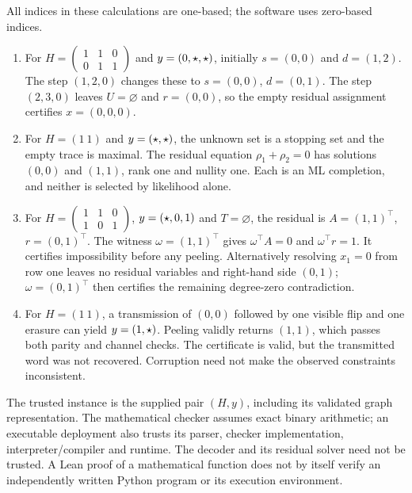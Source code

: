\begin{exa}\label{exa:core}
All indices in these calculations are one-based; the software uses
zero-based indices.
\begin{enumerate}[label=(\alph*),leftmargin=*]
\item For
$H=\left(\begin{smallmatrix}1&1&0\\0&1&1\end{smallmatrix}\right)$ and
$y=(0,\star,\star)$, initially $s=(0,0)$ and $d=(1,2)$.
The step $(1,2,0)$ changes these to $s=(0,0)$, $d=(0,1)$.
The step $(2,3,0)$ leaves $U=\varnothing$ and $r=(0,0)$,
so the empty residual assignment certifies $x=(0,0,0)$.
\item For $H=(1\ 1)$ and $y=(\star,\star)$, the unknown set is
a stopping set and the empty trace is maximal. The residual equation
$\rho_1+\rho_2=0$ has solutions $(0,0)$ and $(1,1)$, rank one and
nullity one. Each is an ML completion, and neither is selected by
likelihood alone.
\item For
$H=\left(\begin{smallmatrix}1&1&0\\1&0&1\end{smallmatrix}\right)$,
$y=(\star,0,1)$ and $T=\varnothing$, the residual is
$A=(1,1)^\top$, $r=(0,1)^\top$.
The witness $\omega=(1,1)^\top$ gives $\omega^\top A=0$ and
$\omega^\top r=1$. It certifies impossibility before any peeling.
Alternatively resolving $x_1=0$ from row one leaves no residual
variables and right-hand side $(0,1)$; $\omega=(0,1)^\top$ then
certifies the remaining degree-zero contradiction.
\item For $H=(1\ 1)$, a transmission of $(0,0)$ followed by one
visible flip and one erasure can yield $y=(1,\star)$.
Peeling validly returns $(1,1)$, which passes both parity and channel
checks. The certificate is valid, but the transmitted word was not
recovered. Corruption need not make the observed constraints
inconsistent.
\end{enumerate}
\end{exa}

The trusted instance is the supplied pair $(H,y)$, including its
validated graph representation. The mathematical checker assumes
exact binary arithmetic; an executable deployment also trusts its
parser, checker implementation, interpreter/compiler and runtime.
The decoder and its residual solver need not be trusted. A Lean
proof of a mathematical function does not by itself verify an
independently written Python program or its execution environment.

